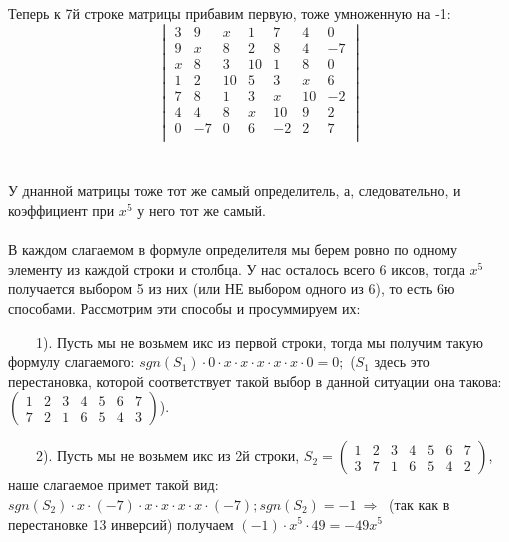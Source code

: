 \documentclass[a4paper, 12pt]{article}
\begin{document}
    \\
    \\ Теперь к 7й строке матрицы прибавим первую, тоже умноженную на -1:
    \\
    \[
        \begin{vmatrix}
            3 & 9 & x & 1 & 7 & 4 & 0 \\
            9 & x & 8 & 2 & 8 & 4 & -7 \\
            x & 8 & 3 & 10 & 1 & 8 & 0 \\
            1 & 2 & 10 & 5 & 3 & x & 6 \\
            7 & 8 & 1 & 3 & x & 10 & -2 \\
            4 & 4 & 8 & x & 10 & 9 & 2 \\
            0 & -7 & 0 & 6 & -2 & 2 & 7 \\
        \end{vmatrix}
    \]
    \\
    \\ У днанной матрицы тоже тот же самый определитель, а, следовательно, и коэффициент при $x^5$ у него тот же самый.
    \\
    \\ В каждом слагаемом в формуле определителя мы берем ровно по одному элементу из каждой строки и столбца.  У нас осталось всего 6 иксов, тогда $x^5$ получается выбором 5 из них (или НЕ выбором одного из 6), то есть 6ю способами. Рассмотрим эти способы и просуммируем их:
    \\
    \par \ \ \ \ 1). Пусть мы не возьмем икс из первой строки, тогда мы получим такую формулу слагаемого: $sgn (S_1) \cdot 0 \cdot x \cdot x \cdot x \cdot x \cdot x \cdot 0 = 0;$ ($S_1$ здесь это перестановка, которой соответствует такой выбор в данной ситуации она такова: $\begin{pmatrix}1 & 2 & 3 & 4 & 5 & 6 & 7 \\ 7 & 2 & 1 & 6 & 5 & 4 & 3 \end{pmatrix}$).
    \\
    \par \ \ \ \ 2). Пусть мы не возьмем икс из 2й строки, $S_2 = \begin{pmatrix}1 & 2 & 3 & 4 & 5 & 6 & 7 \\ 3 & 7 & 1 & 6 & 5 & 4 & 2 \end{pmatrix}$, наше слагаемое примет такой вид: $sgn (S_2) \cdot x \cdot (-7) \cdot x \cdot x \cdot x \cdot x \cdot (-7); sgn(S_2) = -1 \ \Rightarrow \ $ (так как в перестановке 13 инверсий) получаем $ (-1) \cdot x^5 \cdot 49 = -49x^5$
\end{document}
